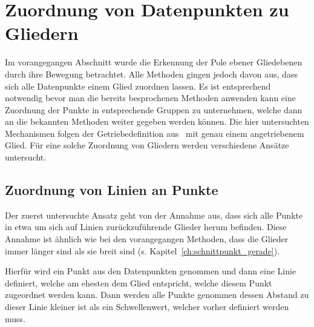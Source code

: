 
\chapter{Zuordnung von Datenpunkten zu Gliedern} \label{ch:gruppierung_von_datenpunkten}


Im vorangegangen Abschnitt wurde die Erkennung der Pole ebener Gliedebenen durch ihre Bewegung betrachtet.
Alle Methoden gingen jedoch davon aus, dass sich alle Datenpunkte einem Glied zuordnen lassen.
Es ist entsprechend notwendig bevor man die bereits besprochenen Methoden anwenden kann eine Zuordnung der Punkte in entsprechende Gruppen zu unternehmen, welche dann an die bekannten Methoden weiter gegeben werden können.
Die hier untersuchten Mechanismen folgen der Getriebedefinition aus~\cite[G167]{Grote2014} mit genau einem angetriebenem Glied.
Für eine solche Zuordnung von Gliedern werden verschiedene Ansätze untersucht.

\section{Zuordnung von Linien an Punkte}

Der zuerst untersuchte Ansatz geht von der Annahme aus, dass sich alle Punkte in etwa um sich auf Linien zurückzuführende Glieder herum befinden.
Diese Annahme ist ähnlich wie bei den vorangegangen Methoden, dass die Glieder immer länger sind als sie breit sind (s. Kapitel~\ref{ch:schnittpunkt_gerade}).

Hierfür wird ein Punkt aus den Datenpunkten genommen und dann eine Linie definiert, welche am ehesten dem Glied entspricht, welche diesem Punkt zugeordnet werden kann.
Dann werden alle Punkte genommen dessen Abstand zu dieser Linie kleiner ist als ein Schwellenwert, welcher vorher definiert werden muss.

